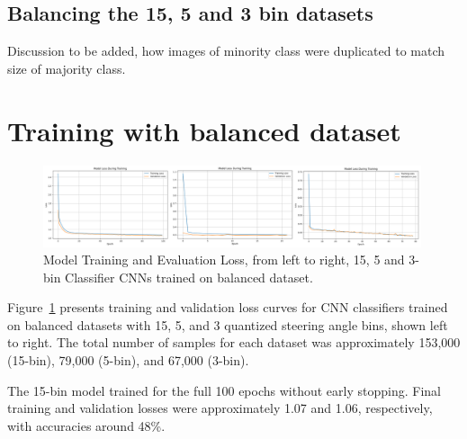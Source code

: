     


\subsection{Balancing the 15, 5 and 3 bin datasets}
Discussion to be added, how images of minority class were duplicated to match size of majority class.


\section{Training with balanced dataset}

\begin{figure}[h]
\centering
\includegraphics[width=0.99\textwidth]{Figures/Results/CNN_15_5_3_balanced_training.png}
\caption{Model Training and Evaluation Loss, from left to right, 15, 5 and 3-bin Classifier CNNs trained on balanced dataset.}
\label{fig:CNN_15_5_3_balanced_training}
\end{figure}

Figure~\ref{fig:CNN_15_5_3_balanced_training} presents training and validation loss curves for CNN classifiers trained on balanced datasets with 15, 5, and 3 quantized steering angle bins, shown left to right. The total number of samples for each dataset was approximately 153,000 (15-bin), 79,000 (5-bin), and 67,000 (3-bin).

The 15-bin model trained for the full 100 epochs without early stopping. Final training and validation losses were approximately 1.07 and 1.06, respectively, with accuracies around 48\%.

